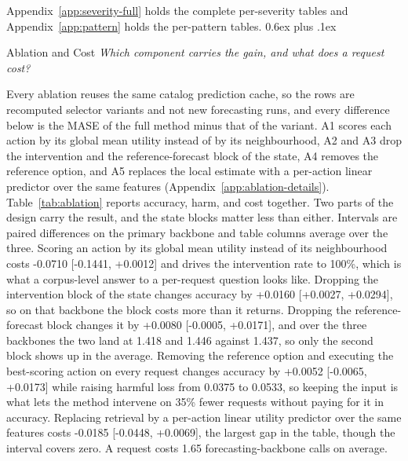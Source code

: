 \documentclass{article}
\makeatletter
\def\subsection{\@startsection{subsection}{2}{\z@}{-1.4ex plus -0.4ex minus -.2ex}%
  {0.6ex plus .1ex}{\normalsize\sc\raggedright}}
\makeatother
\begin{document}
Appendix~\ref{app:severity-full} holds the complete per-severity tables and
Appendix~\ref{app:pattern} holds the per-pattern tables.
\subsection{Ablation and Cost}
\label{sec:exp-ablation}
\emph{Which component carries the gain, and what does a request cost?}

Every ablation reuses the same catalog prediction cache, so the rows are recomputed selector
variants and not new forecasting runs, and every difference below is the MASE of the full
method minus that of the variant. A1 scores each action by its global mean utility instead of
by its neighbourhood, A2 and A3 drop the intervention and the reference-forecast block of the
state, A4 removes the reference option, and A5 replaces the local estimate with a per-action
linear predictor over the same features (Appendix~\ref{app:ablation-details}).
Table~\ref{tab:ablation} reports accuracy, harm, and cost together. Two parts of the design carry the result, and the state blocks matter less than either. Intervals are paired differences on the primary backbone and table columns average over the three. Scoring an action by its global mean utility instead of its neighbourhood costs -0.0710 [-0.1441, +0.0012] and drives the intervention rate to 100\%, which is what a corpus-level answer to a per-request question looks like. Dropping the intervention block of the state changes accuracy by +0.0160 [+0.0027, +0.0294], so on that backbone the block costs more than it returns. Dropping the reference-forecast block changes it by +0.0080 [-0.0005, +0.0171], and over the three backbones the two land at 1.418 and 1.446 against 1.437, so only the second block shows up in the average.
Removing the reference option and executing the best-scoring action on every request changes accuracy by +0.0052 [-0.0065, +0.0173] while raising harmful loss from 0.0375 to 0.0533, so keeping the input is what lets the method intervene on 35\% fewer requests without paying for it in accuracy. Replacing retrieval by a per-action linear utility predictor over the same features costs -0.0185 [-0.0448, +0.0069], the largest gap in the table, though the interval covers zero. A request costs 1.65 forecasting-backbone calls on average.
\end{document}
